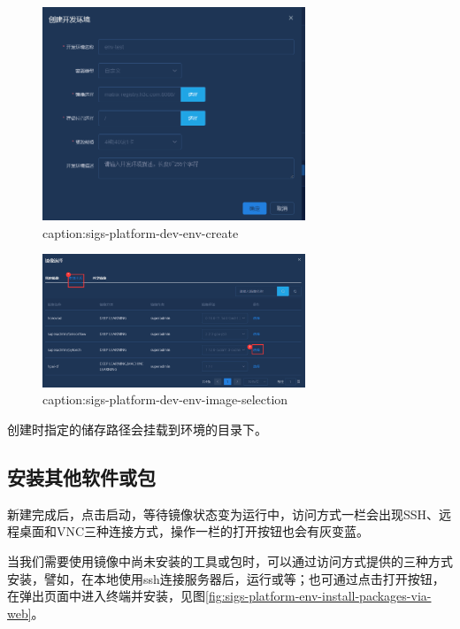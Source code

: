\begin{figure}[htbp]
	\centering
	\includegraphics[width=0.7\textwidth]{figures/sigs-platform-dev-env-create.png}
	\caption{caption:sigs-platform-dev-env-create}
	\label{fig:sigs-platform-dev-env-create}
\end{figure}

\begin{figure}[htbp]
	\centering
	\includegraphics[width=0.7\textwidth]{figures/sigs-platform-dev-env-image-selection.png}
	\caption{caption:sigs-platform-dev-env-image-selection}
	\label{fig:sigs-platform-dev-env-image-selection}
\end{figure}

创建时指定的储存路径会挂载到环境的目录下。

\subsection{安装其他软件或包}

新建完成后，点击启动，等待镜像状态变为运行中，访问方式一栏会出现SSH、远程桌面和VNC三种连接方式，操作一栏的打开按钮也会有灰变蓝。

当我们需要使用镜像中尚未安装的工具或包时，可以通过访问方式提供的三种方式安装，譬如，在本地使用ssh连接服务器后，运行或等；也可通过点击打开按钮，在弹出页面中进入终端并安装，见图\ref{fig:sigs-platform-env-install-packages-via-web}。


